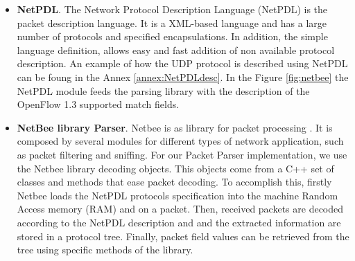     \begin{itemize}
    \item \textbf{NetPDL}. The Network Protocol Description Language (NetPDL)\cite{Risso:2006:NEX:1141112.1141119} is the packet description language. It is a XML-based language and has a large number of protocols and specified encapsulations. In addition, the simple language definition, allows easy and fast addition of non available protocol description. An example of how the UDP protocol is described using NetPDL can be foung in the Annex \ref{annex:NetPDLdesc}. In the Figure \ref{fig:netbee} the NetPDL module feeds the parsing library with the description of the OpenFlow 1.3 supported match fields.
    
    \item \textbf{NetBee library Parser}. Netbee is as library for packet processing \cite{nbee}. It is composed by several modules for different types of network application, such as packet filtering and sniffing. For our Packet Parser implementation, we use the Netbee library decoding objects. This objects come from a C++ set of classes and methods that ease packet decoding. To accomplish this, firstly Netbee loads the NetPDL protocols specification into the machine Random Access memory (RAM) and on a packet. Then, received packets are decoded according to the NetPDL description and and the extracted information are stored in a protocol tree. Finally, packet field values can be retrieved from the tree using specific methods of the library. 
    

\end{itemize}
